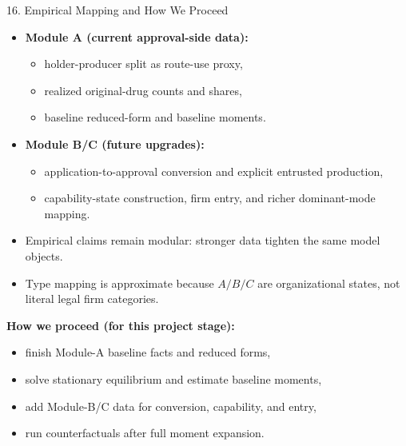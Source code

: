 \documentclass[aspectratio=169,11pt]{beamer}
\begin{document}
\begin{frame}{16. Empirical Mapping and How We Proceed}
\begin{itemize}
    \item \textbf{Module A (current approval-side data):}
    \begin{itemize}
        \item holder-producer split as route-use proxy,
        \item realized original-drug counts and shares,
        \item baseline reduced-form and baseline moments.
    \end{itemize}
    \item \textbf{Module B/C (future upgrades):}
    \begin{itemize}
        \item application-to-approval conversion and explicit entrusted production,
        \item capability-state construction, firm entry, and richer dominant-mode mapping.
    \end{itemize}
    \item Empirical claims remain modular: stronger data tighten the same model objects.
    \item Type mapping is approximate because \(A/B/C\) are organizational states, not literal legal firm categories.
\end{itemize}

\vspace{0.15cm}
\textbf{How we proceed (for this project stage):}
\begin{itemize}
    \item finish Module-A baseline facts and reduced forms,
    \item solve stationary equilibrium and estimate baseline moments,
    \item add Module-B/C data for conversion, capability, and entry,
    \item run counterfactuals after full moment expansion.
\end{itemize}
\end{frame}
\end{document}
